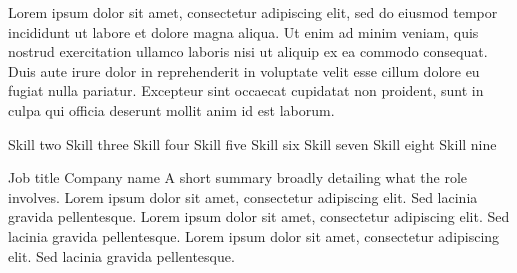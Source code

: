 \documentclass[a4paper]{ReadableCV}
\begin{document}
	






\showHeader



Lorem ipsum dolor sit amet, consectetur adipiscing elit, sed do eiusmod tempor incididunt ut labore et dolore magna aliqua. Ut enim ad minim veniam, quis nostrud exercitation ullamco laboris nisi ut aliquip ex ea commodo consequat. Duis aute irure dolor in reprehenderit in voluptate velit esse cillum dolore eu fugiat nulla pariatur. Excepteur sint occaecat cupidatat non proident, sunt in culpa qui officia deserunt mollit anim id est laborum.


		  {Skill two}
		  {Skill three}
		  {Skill four}
		  {Skill five}
		  {Skill six}
		  {Skill seven}
		  {Skill eight}
		  {Skill nine}
		  


{}
        {Job title}
        {Company name}
        {A short summary broadly detailing what the role involves. Lorem ipsum dolor sit amet, consectetur adipiscing elit. Sed lacinia gravida pellentesque. Lorem ipsum dolor sit amet, consectetur adipiscing elit. Sed lacinia gravida pellentesque. Lorem ipsum dolor sit amet, consectetur adipiscing elit. Sed lacinia gravida pellentesque.}
\end{document}

